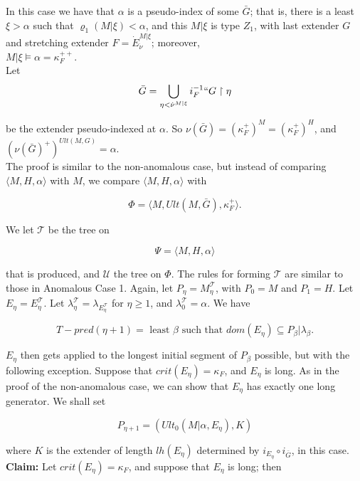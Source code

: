 \documentclass[12pt]{article}
\begin{document}
In this case we have that $\alpha$ is a pseudo-index of some $\bar{G}$; that is, there is a least $\xi > \alpha$ such that $\varrho_1 (M | \xi ) < \alpha$, and this $M | \xi$ is type $Z_1$, with last extender $G$ and stretching extender $F = \dot{E}_{\dot{\nu}}^{M | \xi }$; moreover,\\

\indent $M | \xi \models \alpha = \kappa_F^{++}$.\\

Let
\[
\bar{G} = \bigcup_{\eta < \dot{\nu}^{M | \xi}} i_F^{-1} `` G \restriction \eta
\]

be the extender pseudo-indexed at $\alpha$.  So $\nu (\bar{G}) = (\kappa_F^+)^M = (\kappa_F^+)^H$, and $(\nu (\bar{G})^+)^{Ult(M, G)} = \alpha$.\\

The proof is similar to the non-anomalous case, but instead of comparing $\langle M , H, \alpha \rangle$ with $M$, we compare $\langle M , H, \alpha \rangle$ with

\[
\Phi = \langle M , Ult (M, \bar{G}) , \kappa_F^+ \rangle .
\]

We let $\mathscr{T}$ be the tree on

\[
\Psi = \langle M , H, \alpha \rangle
\]

that is produced, and $\mathscr{U}$ the tree on $\Phi$.  The rules for forming $\mathscr{T}$ are similar to those in Anomalous Case 1.  Again, let $P_\eta = M_\eta^{\mathscr{T}}$, with $P_0 = M$ and $P_1 = H$.  Let $E_\eta = E_\eta^{\mathscr{T}}$.  Let $\lambda_\eta^{\mathscr{T}} = \lambda_{E_\eta^{\mathscr{T}}}$ for $\eta \geq 1$, and $\lambda_0^{\mathscr{T}} = \alpha$.  We have

\[
T-pred (\eta + 1) = \text{ least } \beta \text{ such that } dom( E_\eta) \subseteq P_\beta | \lambda_\beta .
\]

$E_\eta$ then gets applied to the longest initial segment of $P_\beta$ possible, but with the following exception.  Suppose that $crit(E_\eta ) = \kappa_F$, and $E_\eta$ is long.  As in the proof of the non-anomalous case, we can show that $E_\eta$ has exactly one long generator.  We shall set

\[
P_{\eta + 1} = (Ult_0 (M | \alpha , E_\eta ), K)
\]

where $K$ is the extender of length $lh(E_\eta)$ determined by $i_{E_\eta} \circ i_{\bar{G}}$, in this case.\\

\textbf{Claim:}  Let $crit(E_\eta) = \kappa_F$, and suppose that $E_\eta$ is long; then\\
\end{document}

